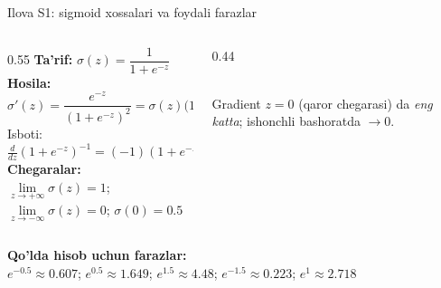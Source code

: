 \documentclass[aspectratio=169,11pt]{beamer}
\begin{document}
\begin{frame}{Ilova S1: sigmoid xossalari va foydali farazlar}
  \small
  \begin{columns}[T]
    \begin{column}{0.55\textwidth}
      \textbf{Ta'rif:}\quad
      $\sigma(z)=\dfrac{1}{1+e^{-z}}$\\[6pt]
      \textbf{Hosila:}
      \[
        \sigma'(z)
        =\frac{e^{-z}}{(1+e^{-z})^2}
        =\sigma(z)\bigl(1-\sigma(z)\bigr)
      \]
      \textcolor{halfgray}{\footnotesize
        Isboti: $\tfrac{d}{dz}(1+e^{-z})^{-1}
        =(-1)(1+e^{-z})^{-2}(-e^{-z})$}\\[6pt]
      \textbf{Chegaralar:}\\[2pt]
      $\lim\limits_{z\to+\infty}\sigma(z)=1$;\quad
      $\lim\limits_{z\to-\infty}\sigma(z)=0$;\quad
      $\sigma(0)=0.5$
    \end{column}
    \begin{column}{0.44\textwidth}
      \centering
      \\[2pt]
      {\footnotesize\color{halfgray}Gradient $z{=}0$ (qaror chegarasi)
       da \emph{eng katta}; ishonchli bashoratda $\to 0$.}
    \end{column}
  \end{columns}
  \vspace{6pt}
  \textbf{Qo'lda hisob uchun farazlar:}\\[3pt]
  $e^{-0.5}\approx 0.607$;\quad
  $e^{0.5}\approx 1.649$;\quad
  $e^{1.5}\approx 4.48$;\quad
  $e^{-1.5}\approx 0.223$;\quad
  $e^{1}\approx 2.718$
\end{frame}
\end{document}
